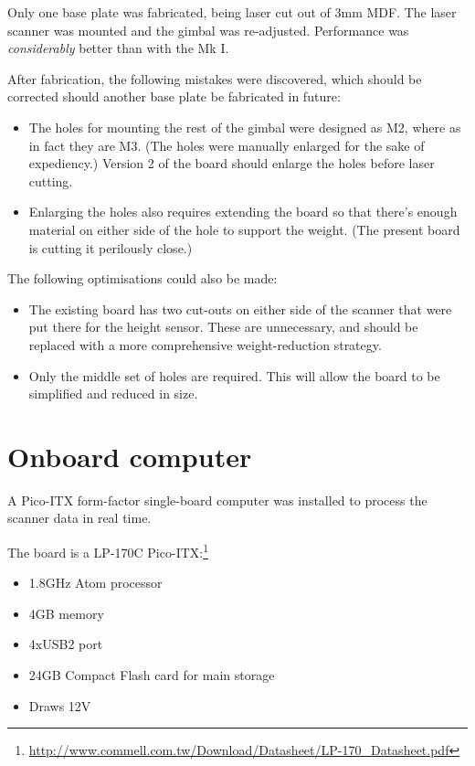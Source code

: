 \documentclass[12pt,oneside,a4paper]{book}
\begin{document}
Only one base plate was fabricated, being laser cut out of 3mm
MDF. The laser scanner was mounted and the gimbal was
re-adjusted. Performance was \emph{considerably} better than with the
Mk I.

After fabrication, the following mistakes were discovered, which
should be corrected should another base plate be fabricated in future:
\begin{itemize}
\item The holes for mounting the rest of the gimbal were designed as
  M2, where as in fact they are M3. (The holes were manually enlarged
  for the sake of expediency.) Version 2 of the board should enlarge
  the holes before laser cutting.
\item Enlarging the holes also requires extending the board so that
  there's enough material on either side of the hole to support the
  weight. (The present board is cutting it perilously close.)
\end{itemize}

The following optimisations could also be made:
\begin{itemize}
\item The existing board has two cut-outs on either side of the
  scanner that were put there for the height sensor. These are
  unnecessary, and should be replaced with a more comprehensive
  weight-reduction strategy.
\item Only the middle set of holes are required. This will allow the
  board to be simplified and reduced in size.
\end{itemize}

\newpage
\section{Onboard computer}
\label{sec:onboard-computer}

A Pico-ITX form-factor single-board computer was installed to process
the scanner data in real time. 

The board is a LP-170C Pico-ITX:\footnote{\url{http://www.commell.com.tw/Download/Datasheet/LP-170_Datasheet.pdf}}
\begin{itemize}
\item 1.8GHz Atom processor
\item 4GB memory
\item 4xUSB2 port
\item 24GB Compact Flash card for main storage
\item Draws 12V
\end{itemize}
\end{document}
